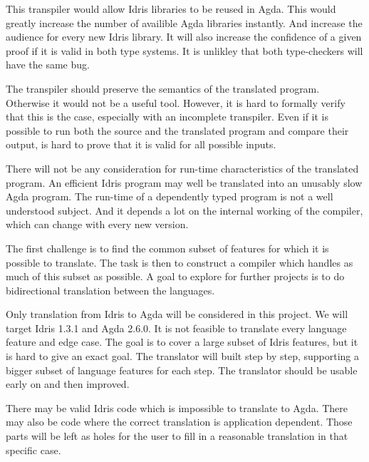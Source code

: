 \documentclass[parskip=half]{scrartcl}
\begin{document}

This transpiler would allow Idris libraries to be reused in Agda. This would
greatly increase the number of availible Agda libraries instantly. And increase
the audience for every new Idris library.  It will also increase the confidence
of a given proof if it is valid in both type systems. It is unlikley that both
type-checkers will have the same bug.

The transpiler should preserve the semantics of the translated program.
Otherwise it would not be a useful tool. However, it is hard to formally verify
that this is the case, especially with an incomplete transpiler. Even if it is
possible to run both the source and the translated program and compare their
output, is hard to prove that it is valid for all possible inputs.

There will not be any consideration for run-time characteristics of the
translated program. An efficient Idris program may well be translated into an
unusably slow Agda program. The run-time of a dependently typed program is not
a well understood subject. And it depends a lot on the internal working of the
compiler, which can change with every new version.


The first challenge is to find the common subset of features for which it is
possible to translate. The task is then to construct a compiler which handles
as much of this subset as possible.
A goal to explore for further projects is to do bidirectional translation
between the languages.



Only translation from Idris to Agda will be considered in this project. We will
target Idris 1.3.1 and Agda 2.6.0. It is not feasible to translate every
language feature and edge case.  The goal is to cover a large subset of Idris
features, but it is hard to give an exact goal.  The translator will built step
by step, supporting a bigger subset of language features for each step. The
translator should be usable early on and then improved.

There may be valid Idris code which is impossible to translate to Agda. There
may also be code where the correct translation is application dependent. Those
parts will be left as holes for the user to fill in a reasonable translation in
that specific case.
\end{document}
